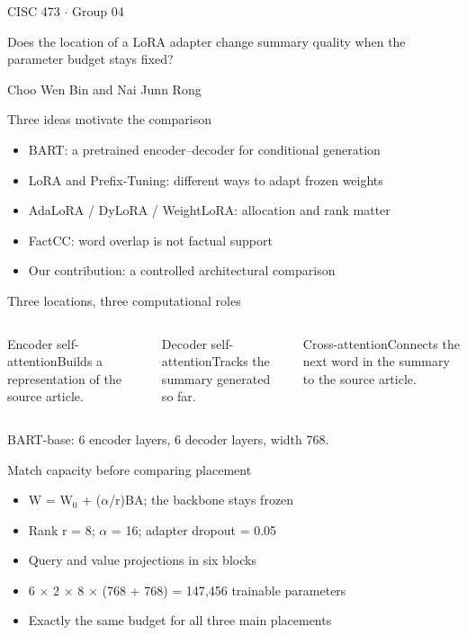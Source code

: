 \documentclass[aspectratio=169,11pt]{beamer}
\begin{document}
\begingroup{}\begin{frame}[plain]\color{white}
{\small CISC 473 $\cdot$ Group 04}\par\vspace{6mm}{\Huge\bfseries Where to adapt BART?}\par\vspace{4mm}Does the location of a LoRA adapter change summary quality when the parameter budget stays fixed?\par\vspace{6mm} Choo Wen Bin and Nai Junn Rong\end{frame}\endgroup
\begin{frame}{Three ideas motivate the comparison}
\begin{itemize}
\item BART: a pretrained encoder--decoder for conditional generation
\item LoRA and Prefix-Tuning: different ways to adapt frozen weights
\item AdaLoRA / DyLoRA / WeightLoRA: allocation and rank matter
\item FactCC: word overlap is not factual support
\item Our contribution: a controlled architectural comparison
\end{itemize}
\end{frame}
\begin{frame}{Three locations, three computational roles}\begin{columns}[T,onlytextwidth]\begin{block}{Encoder self-attention}Builds a representation of the source article.\end{block}\begin{block}{Decoder self-attention}Tracks the summary generated so far.\end{block}\begin{block}{Cross-attention}Connects the next word in the summary to the source article.\end{block}\end{columns}\vspace{6mm}\par BART-base: 6 encoder layers, 6 decoder layers, width 768.\end{frame}
\begin{frame}{Match capacity before comparing placement}
\begin{itemize}
\item W = W$_0$ + ($\alpha$/r)BA; the backbone stays frozen
\item Rank r = 8; $\alpha$ = 16; adapter dropout = 0.05
\item Query and value projections in six blocks
\item 6 $\times$ 2 $\times$ 8 $\times$ (768 + 768) = 147,456 trainable parameters
\item Exactly the same budget for all three main placements
\end{itemize}
\end{frame}
\end{document}
